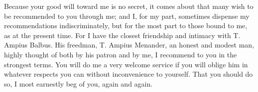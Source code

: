 

 Because your good will toward me is no secret, it comes about that many wish to be recommended to you through me; and I, for my part, sometimes dispense my recommendations indiscriminately, but for the most part to those bound to me, as at the present time. For I have the closest friendship and intimacy with T. Ampius Balbus. His freedman, T. Ampius Menander, an honest and modest man, highly thought of both by his patron and by me, I recommend to you in the strongest terms. You will do me a very welcome service if you will oblige him in whatever respects you can without inconvenience to yourself. That you should do so, I most earnestly beg of you, again and again.
